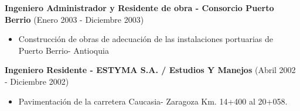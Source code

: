 \documentclass[letterpaper,10pt]{article}
\begin{document}
  \vspace*{0.1cm}
  \textbf{Ingeniero Administrador y Residente de obra - Consorcio Puerto Berrio} (Enero 2003 - Diciembre 2003)
  \hfill
  \vspace*{0.1cm}
  \begin{minipage}{\linewidth}
    \begin{itemize}[noitemsep]
      \item Construcción de obras de adecuación de las instalaciones portuarias de Puerto Berrio- Antioquia
    \end{itemize}
    \hfill
  \end{minipage}
  
  \vspace*{0.1cm}
  \textbf{Ingeniero Residente - ESTYMA S.A. / Estudios Y Manejos} (Abril 2002 - Diciembre 2002)
  \hfill
  \vspace*{0.1cm}
  \begin{minipage}{\linewidth}
    \begin{itemize}[noitemsep]
      \item Pavimentación de la carretera Caucasia- Zaragoza Km. 14+400 al 20+058.
    \end{itemize}
    \hfill
  \end{minipage}
\end{document}
